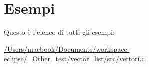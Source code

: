 \section{Esempi}
Questo è l'elenco di tutti gli esempi:\begin{DoxyCompactItemize}
\item 
\hyperlink{_2_users_2macbook_2_documents_2workspace-eclipse_2__other_test_2vector_list_2src_2vettori_8c-example}{/Users/macbook/Documents/workspace-\/eclipse/\_\-Other\_\-test/vector\_\-list/src/vettori.c}
\end{DoxyCompactItemize}
